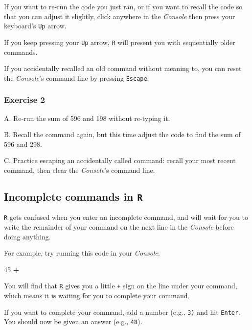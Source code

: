 \documentclass[
]{book}
\newenvironment{Shaded}{\begin{snugshade}}{\end{snugshade}}
\newcommand{\DecValTok}[1]{\textcolor[rgb]{0.00,0.00,0.81}{#1}}
\newcommand{\OperatorTok}[1]{\textcolor[rgb]{0.81,0.36,0.00}{\textbf{#1}}}
\begin{document}
If you want to re-run the code you just ran, or if you want to recall the code so that you can adjust it slightly, click anywhere in the \emph{Console} then press your keyboard's \texttt{Up} arrow.

If you keep pressing your \texttt{Up} arrow, \texttt{R} will present you with sequentially older commands.

If you accidentally recalled an old command without meaning to, you can reset the \emph{Console}'s command line by pressing \texttt{Escape}.

\hypertarget{exercise-2}{%
\subsubsection*{Exercise 2}\label{exercise-2}}

A. Re-run the sum of 596 and 198 without re-typing it.

B. Recall the command again, but this time adjust the code to find the sum of 596 and 298.

C. Practice escaping an accidentally called command: recall your most recent command, then clear the \emph{Console}'s command line.

\hypertarget{incomplete-commands-in-r}{%
\subsection*{\texorpdfstring{Incomplete commands in \texttt{R}}{Incomplete commands in R}}\label{incomplete-commands-in-r}}

\texttt{R} gets confused when you enter an incomplete command, and will wait for you to write the remainder of your command on the next line in the \emph{Console} before doing anything.

For example, try running this code in your \emph{Console}:

\begin{Shaded}
\begin{Highlighting}[]
\DecValTok{45} \OperatorTok{+}
\end{Highlighting}
\end{Shaded}

You will find that \texttt{R} gives you a little \texttt{+} sign on the line under your command, which means it is waiting for you to complete your command.

If you want to complete your command, add a number (e.g., \texttt{3)} and hit \texttt{Enter}. You should now be given an answer (e.g., \texttt{48}).
\end{document}
